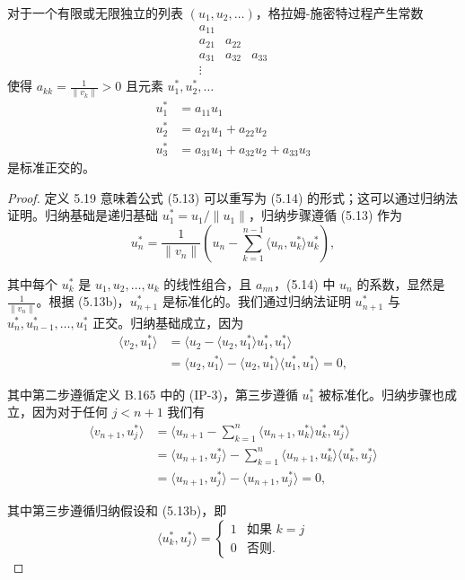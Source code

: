 \documentclass[a4paper]{ctexart}
\newcommand{\hl}[1]
{\noindent {\bf {#1}}}
\begin{document}
{\hl{定理 5.20} 对于一个有限或无限独立的列表 \((u_1, u_2, \ldots)\)，格拉姆-施密特过程产生常数
\[
\begin{array}{ccc}
a_{11} &&\\
a_{21} & a_{22} &\\
a_{31} & a_{32} & a_{33} \\
\vdots
\end{array}
\]
使得 \(a_{kk} = \frac{1}{\|v_k\|} > 0\) 且元素 \(u_1^*, u_2^*, \ldots\)
\begin{align*}
u_1^* &= a_{11}u_1 \\
u_2^* &= a_{21}u_1 + a_{22}u_2 \\
u_3^* &= a_{31}u_1 + a_{32}u_2 + a_{33}u_3
\end{align*}
是标准正交的。

\begin{proof}
定义 5.19 意味着公式 (5.13) 可以重写为 (5.14) 的形式；这可以通过归纳法证明。归纳基础是递归基础 \(u_1^* = u_1 / \|u_1\|\)，归纳步骤遵循 (5.13) 作为
\[
  u_n^* = \frac{1}{\|v_n\|} \left( u_n - \sum_{k=1}^{n-1} \langle u_n, u_k^* \rangle u_k^* \right),
\]

其中每个 \(u_k^*\) 是 \(u_1, u_2, \ldots, u_k\) 的线性组合，且 \(a_{nn}\)，(5.14) 中 \(u_n\) 的系数，显然是 \(\frac{1}{\|v_n\|}\)。根据 (5.13b)，\(u_{n+1}^*\) 是标准化的。我们通过归纳法证明 \(u_{n+1}^*\) 与 \(u_n^*, u_{n-1}^*, \ldots, u_1^*\) 正交。归纳基础成立，因为
\begin{align*}
  \langle v_2, u_1^* \rangle &= \langle u_2 - \langle u_2, u_1^* \rangle u_1^*, u_1^* \rangle \\
  &= \langle u_2, u_1^* \rangle - \langle u_2, u_1^* \rangle \langle u_1^*, u_1^* \rangle = 0,
  \end{align*}
  
其中第二步遵循定义 B.165 中的 (IP-3)，第三步遵循 \(u_1^*\) 被标准化。归纳步骤也成立，因为对于任何 \(j < n+1\) 我们有
\begin{align*}
  \langle v_{n+1}, u_j^* \rangle &= \langle u_{n+1} - \sum_{k=1}^n \langle u_{n+1}, u_k^* \rangle u_k^*, u_j^* \rangle \\
  &= \langle u_{n+1}, u_j^* \rangle - \sum_{k=1}^n \langle u_{n+1}, u_k^* \rangle \langle u_k^*, u_j^* \rangle \\
  &= \langle u_{n+1}, u_j^* \rangle - \langle u_{n+1}, u_j^* \rangle = 0,
\end{align*}

其中第三步遵循归纳假设和 (5.13b)，即
\[
  \langle u_k^*, u_j^* \rangle = \begin{cases} 
  1 & \text{如果 } k = j \\
  0 & \text{否则.}
  \end{cases} \tag{5.16}
\]    
\end{proof}

}
\end{document}
